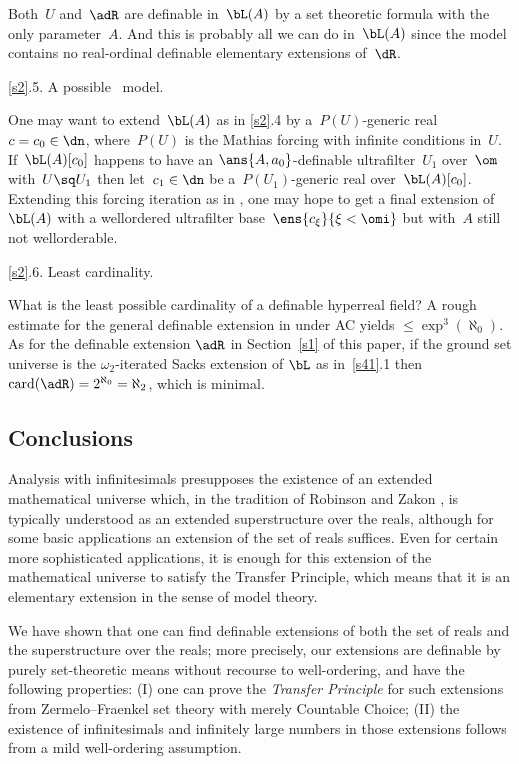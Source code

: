\documentclass[11pt,
]{article}
\begin{document}
Both~$U$ and~$\adR$ are definable in~$\bL(A)$ by a 
set theoretic formula with the only parameter~$A$.
And this is probably all we can do in~$\bL(A)$
since the model contains no real-ordinal 
definable elementary extensions of~$\dR$.
\vom

{\ubf\ref{s2}.5.  A possible \wob\ model.}  

One may want to extend~$\bL(A)$ as in \ref{s2}.4 by a~$P(U)$-generic
real~$c=c_0\in\dn$, where~$P(U)$ is the Mathias forcing with infinite
conditions in~$U$.  If~$\bL(A)[c_0]$ happens to have an
$\ans{A,a_0}$-definable ultrafilter~$U_1$ over~$\om$ with~$U\sq U_1$
then let~$c_1\in\dn$ be a~$P(U_1)$-generic real over~$\bL(A)[c_0]$.
Extending this forcing iteration as in \cite [A10 in Chapter 8] {kun},
one may hope to get a final extension of~$\bL(A)$ with a wellordered
ultrafilter base~$\ens{c_\xi}{\xi<\omi}$ but with~$A$ still not
wellorderable.


{\ubf\ref{s2}.6.  Least cardinality.}  

What is the least possible cardinality of a definable hyperreal field?
A rough estimate for the general definable extension in \cite{KS}
under AC yields $\le {\exp^3(\aleph_0)}$.  As for the definable
extension $\adR$ in Section~\ref{s1} of this paper, if the ground set
universe is the $\omega_2$-iterated Sacks extension of $\bL$ as
in~\ref{s41}.1 then $\text{card}(\adR)=2^{\aleph_0}=\aleph_2$, which
is minimal.


\subsection{Conclusions}
\label{conc}

Analysis with infinitesimals presupposes the existence of an extended
mathematical universe which, in the tradition of Robinson and Zakon
\cite{RZ}, is typically understood as an extended superstructure over
the reals, although for some basic applications an extension of the
set of reals suffices.  Even for certain more sophisticated
applications, it is enough for this extension of the mathematical
universe to satisfy the Transfer Principle, which means that it is an
elementary extension in the sense of model theory.

We have shown that one can find definable extensions of both the set
of reals and the superstructure over the reals; more precisely, our
extensions are definable by purely set-theoretic means without
recourse to well-ordering, and have the following properties: (I) one
can prove the \emph{Transfer Principle} for such extensions from
Zermelo--Fraenkel set theory with merely Countable Choice; (II) the
existence of infinitesimals and infinitely large numbers in those
extensions follows from a mild well-ordering assumption.
\end{document}
